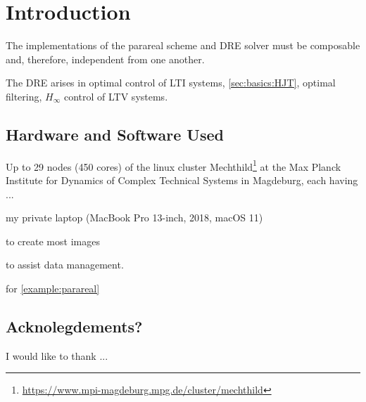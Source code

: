 \chapter{Introduction}

The implementations of the parareal scheme and \ac{DRE} solver must be composable and,
therefore, independent from one another.

The \ac{DRE} arises in \eg optimal control of \ac{LTI} systems, \cf \autoref{sec:basics:HJT},
optimal filtering, $H_\infty$ control of \ac{LTV} systems.

\section*{Hardware and Software Used}

Up to 29 nodes (450 cores) of the linux cluster Mechthild\footnote{\url{https://www.mpi-magdeburg.mpg.de/cluster/mechthild}}
at the Max Planck Institute for Dynamics of Complex Technical Systems in Magdeburg, each having ...

my private laptop (MacBook Pro 13-inch, 2018, macOS 11)

 \cite{Makie} to create most images

 \cite{DrWatson} to assist data management.

 \cite{DifferentialEquations} for \autoref{example:parareal}

\section*{Acknolegdements?}

I would like to thank ...

